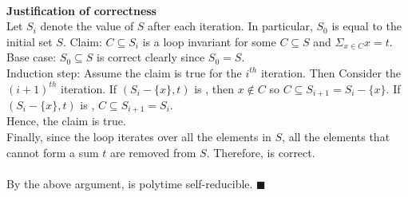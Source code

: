\documentclass[11pt]{article}
\begin{document}
\\
{\bf Justification of correctness}\\
Let $S_i$ denote the value of $S$ after each iteration. In particular, $S_0$ is equal to the initial set $S$.
Claim: $C \subseteq S_i$ is a loop invariant for some $C \subseteq S$ and $\Sigma_{x \in C} x = t$.\\
Base case: $S_0 \subseteq S$ is correct clearly since $S_0 = S$.\\
Induction step: Assume the claim is true for the $i^{th}$ iteration. Then Consider the $(i+ 1)^{th}$ iteration. If $(S_i - \{x\}, t)$ is , then $x\notin C$ so $C\subseteq S_{i+1} = S_i - \{x\} $. If $(S_i - \{x\}, t)$ is , $C\subseteq S_{i+1} = S_i$.\\
Hence, the claim is true.\\
Finally, since the loop iterates over all the elements in $S$, all the elements that cannot form a sum $t$ are removed from $S$. Therefore,  is correct.\\
\\
By the above argument,  is polytime self-reducible. $\blacksquare$
\end{document}
